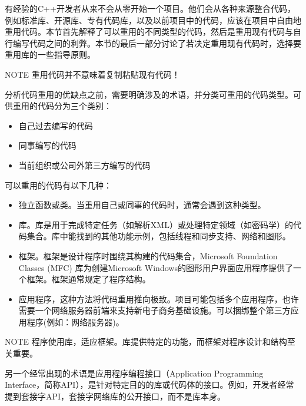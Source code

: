 
有经验的C++开发者从来不会从零开始一个项目。他们会从各种来源整合代码，例如标准库、开源库、专有代码库，以及以前项目中的代码，应该在项目中自由地重用代码。本节首先解释了可以重用的不同类型的代码，然后是重用现有代码与自行编写代码之间的利弊。本节的最后一部分讨论了若决定重用现有代码时，选择要重用库的一些指导原则。

\begin{myNotic}{NOTE}
重用代码并不意味着复制粘贴现有代码！
\end{myNotic}


分析代码重用的优缺点之前，需要明确涉及的术语，并分类可重用的代码类型。可供重用的代码分为三个类别：

\begin{itemize}
\item
自己过去编写的代码

\item
同事编写的代码

\item
当前组织或公司外第三方编写的代码
\end{itemize}

可以重用的代码有以下几种：

\begin{itemize}
\item
独立函数或类。当重用自己或同事的代码时，通常会遇到这种类型。

\item
库。库是用于完成特定任务（如解析XML）或处理特定领域（如密码学）的代码集合。库中能找到的其他功能示例，包括线程和同步支持、网络和图形。

\item
框架。框架是设计程序时围绕其构建的代码集合，Microsoft Foundation Classes (MFC) 库为创建Microsoft Windows的图形用户界面应用程序提供了一个框架。框架通常规定了程序结构。

\item
应用程序，这种方法将代码重用推向极致。项目可能包括多个应用程序，也许需要一个网络服务器前端来支持新电子商务基础设施。可以捆绑整个第三方应用程序(例如：网络服务器)。
\end{itemize}

\begin{myNotic}{NOTE}
程序使用库，适应框架。库提供特定的功能，而框架对程序设计和结构至关重要。
\end{myNotic}

另一个经常出现的术语是应用程序编程接口（Application Programming Interface，简称API），是针对特定目的的库或代码体的接口。例如，开发者经常提到套接字API，套接字网络库的公开接口，而不是库本身。

